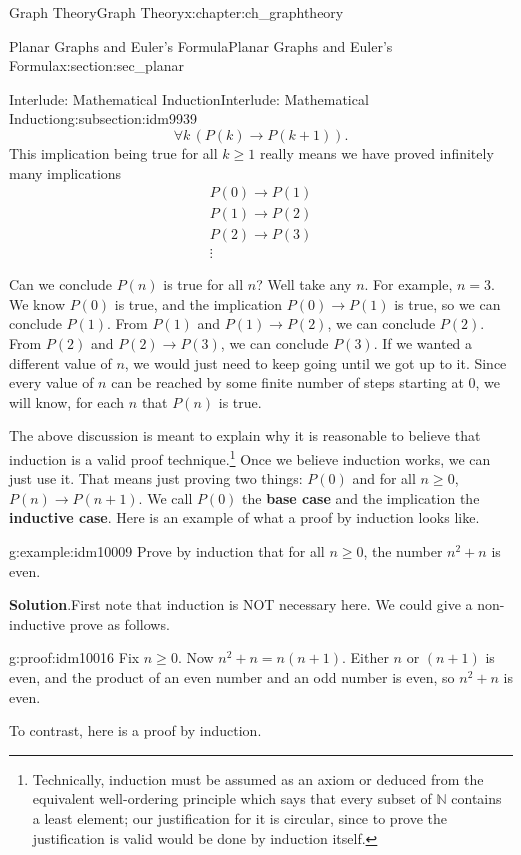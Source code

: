 \documentclass[oneside,10pt,]{book}
\newcommand{\terminology}[1]{\textbf{#1}}
\numberwithin{equation}{chapter}
\def\N{\mathbb N}
\def\imp{\rightarrow}
\begin{document}
\begin{chapterptx}{Graph Theory}{}{Graph Theory}{}{}{x:chapter:ch_graphtheory}
\begin{sectionptx}{Planar Graphs and Euler's Formula}{}{Planar Graphs and Euler's Formula}{}{}{x:section:sec_planar}
\begin{subsectionptx}{Interlude: Mathematical Induction}{}{Interlude: Mathematical Induction}{}{}{g:subsection:idm9939}
\begin{equation*}
\forall k \,(P(k) \imp P(k+1)).
\end{equation*}
This implication being true for all \(k \ge 1\) really means we have proved infinitely many implications%
\begin{gather*}
P(0) \imp P(1)\\
P(1) \imp P(2)\\
P(2) \imp P(3)\\
\vdots
\end{gather*}
%
\par
Can we conclude \(P(n)\) is true for all \(n\)?  Well take any \(n\).  For example, \(n = 3\).  We know \(P(0)\) is true, and the implication \(P(0) \imp P(1)\) is true, so we can conclude \(P(1)\).  From \(P(1)\) and \(P(1) \imp P(2)\), we can conclude \(P(2)\).  From \(P(2)\) and \(P(2) \imp P(3)\), we can conclude \(P(3)\).  If we wanted a different value of \(n\), we would just need to keep going until we got up to it.  Since every value of \(n\) can be reached by some finite number of steps starting at 0, we will know, for each \(n\) that \(P(n)\) is true.%
\par
The above discussion is meant to explain why it is reasonable to believe that induction is a valid proof technique.\footnote{Technically, induction must be assumed as an axiom or deduced from the equivalent well-ordering principle which says that every subset of \(\N\) contains a least element; our justification for it is circular, since to prove the justification is valid would be done by induction itself.\label{g:fn:idm10001}}  Once we believe induction works, we can just use it.  That means just proving two things: \(P(0)\) and for all \(n \ge 0\), \(P(n) \imp P(n+1)\).  We call \(P(0)\) the \terminology{base case} and the implication the \terminology{inductive case}.  Here is an example of what a proof by induction looks like.%
\begin{example}{}{g:example:idm10009}%
Prove by induction that for all \(n \ge 0\), the number \(n^2 + n\) is even.%
\par\smallskip%
\noindent\textbf{Solution}.\hypertarget{g:solution:idm10014}{}\quad{}First note that induction is NOT necessary here.  We could give a non-inductive prove as follows.%
\begin{proofptx}{}{g:proof:idm10016}
Fix \(n \ge 0\).  Now \(n^2 + n = n(n+1)\).  Either \(n\) or \((n+1)\) is even, and the product of an even number and an odd number is even, so \(n^2 + n\) is even.%
\end{proofptx}
To contrast, here is a proof by induction.%

\end{example}
\end{subsectionptx}
\end{sectionptx}
\end{chapterptx}
\end{document}
